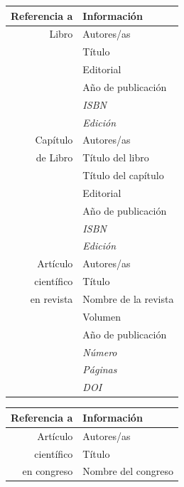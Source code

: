 \begin{table}[!hbt]
    \centering
    \begin{minipage}{0.48\linewidth}
        \centering    
        \begin{tabular}{r|l}
            \toprule
            Referencia a & Información \\
            \midrule
            Libro & Autores/as \\
            & Título \\
            & Editorial \\
            & Año de publicación \\
            & {\it ISBN} \\
            & {\it Edición} \\
            \midrule
            Capítulo & Autores/as\\
            de Libro & Título del libro\\
            & Título del capítulo\\
            & Editorial\\
            & Año de publicación\\
            & {\it ISBN} \\
            & {\it Edición} \\
            \midrule
            Artículo & Autores/as\\
            científico & Título\\
            en revista & Nombre de la revista\\
            & Volumen \\
            & Año de publicación\\
            & {\it Número} \\  
            & {\it Páginas} \\
            & {\it DOI} \\
            \bottomrule
        \end{tabular}
    \end{minipage}%
    \hfill
    \begin{minipage}{0.48\linewidth}
        \centering
        \begin{tabular}{r|l}
            \toprule
            Referencia a & Información \\
            \midrule
            Artículo & Autores/as\\
            científico & Título\\
            en congreso & Nombre del congreso\\

\end{tabular}
\end{minipage}
\end{table}
